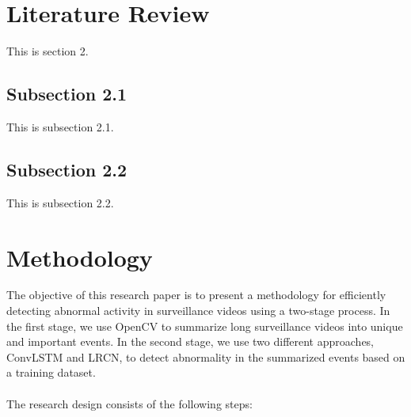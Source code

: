 \documentclass[title page]{article}
\begin{document}
\section{Literature Review}

This is section 2.

\subsection{Subsection 2.1}

This is subsection 2.1.

\subsection{Subsection 2.2}

This is subsection 2.2.

\section{Methodology}

The objective of this research paper is to present a methodology for efficiently detecting abnormal activity in surveillance videos using a two-stage process. In the first stage, we use OpenCV to summarize long surveillance videos into unique and important events. In the second stage, we use two different approaches, ConvLSTM and LRCN, to detect abnormality in the summarized events based on a training dataset.
\\ \\
The research design consists of the following steps:
\end{document}
